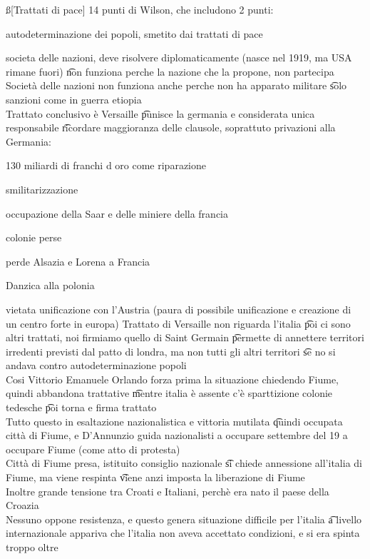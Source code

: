 \documentclass[12pt]{article}
\begin{document}
\ss[Trattati di pace]
14 punti di Wilson, che includono 2 punti: 
\bi
  \item autodeterminazione dei popoli, smetito dai trattati di pace
  \item societa delle nazioni, deve risolvere diplomaticamente (nasce nel 1919, ma USA rimane fuori) \t non funziona perche la nazione che la propone, non partecipa
\ei
Società delle nazioni non funziona anche perche non ha apparato militare \t solo sanzioni come in guerra etiopia \\
Trattato conclusivo è Versaille \t punisce la germania e considerata unica responsabile \t ricordare maggioranza delle clausole, soprattuto privazioni alla Germania:
\bi
  \item 130 miliardi di franchi d oro come riparazione
  \item smilitarizzazione
  \item occupazione della Saar e delle miniere della francia
  \item colonie perse
  \item perde Alsazia e Lorena a Francia
  \item Danzica alla polonia
  \item vietata unificazione con l'Austria (paura di possibile unificazione e creazione di un centro forte in europa)
\ei
Trattato di Versaille non riguarda l'italia \t poi ci sono altri trattati, noi firmiamo quello di Saint Germain \t permette di annettere territori irredenti previsti dal patto di londra, ma non tutti gli altri territori \t se no si andava contro autodeterminazione popoli \\
Cosi Vittorio Emanuele Orlando forza prima la situazione chiedendo Fiume, quindi abbandona trattative \t mentre italia è assente c'è sparttizione colonie tedesche \t poi torna e firma trattato \\
Tutto questo in esaltazione nazionalistica e vittoria mutilata \t quindi occupata città di Fiume, e D'Annunzio guida nazionalisti a occupare settembre del 19 a occupare Fiume (come atto di protesta) \\
Città di Fiume presa, istituito consiglio nazionale \t si chiede annessione all'italia di Fiume, ma viene respinta \t viene anzi imposta la liberazione di Fiume \\
Inoltre grande tensione tra Croati e Italiani, perchè era nato il paese della Croazia \\
Nessuno oppone resistenza, e questo genera situazione difficile per l'italia \t a livello internazionale appariva che l'italia non aveva accettato condizioni, e si era spinta troppo oltre \\
\end{document}
